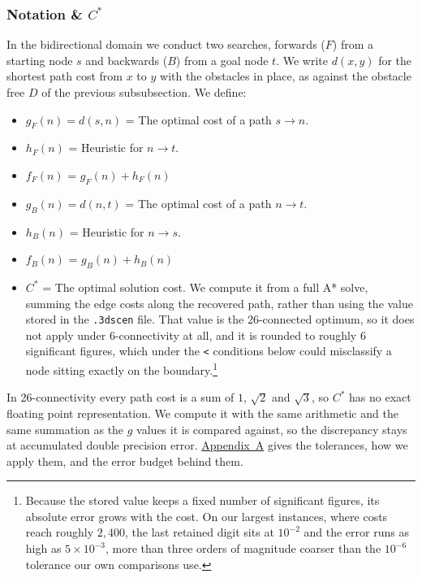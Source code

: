 \documentclass[letterpaper]{article} %
\begin{document}
\subsubsection{Notation \& $C^*$}
In the bidirectional domain we conduct two searches, forwards ($F$) from a starting node $s$ and backwards ($B$) from a goal node $t$. We write $d(x,y)$ for the shortest path cost from $x$ to $y$ with the obstacles in place, as against the obstacle free $D$ of the previous subsubsection. We define:
\begin{itemize}
  \item $g_F(n) = d(s,n)$ = The optimal cost of a path $s \to n$.
  \item $h_F(n)$ = Heuristic for $n \to t$.
  \item $f_F(n)$ = $g_F(n)+h_F(n)$
  \item $g_B(n) = d(n,t)$ = The optimal cost of a path $n \to t$.
  \item $h_B(n)$ = Heuristic for $n \to s$.
  \item $f_B(n)$ = $g_B(n)+h_B(n)$
  \item $C^*$ = The optimal solution cost. We compute it from a full A* solve, summing the edge costs along the recovered path, rather than using the value stored in the \texttt{.3dscen} file. That value is the 26-connected optimum, so it does not apply under 6-connectivity at all, and it is rounded to roughly 6 significant figures, which under the \texttt{<} conditions below could misclassify a node sitting exactly on the boundary.\footnote{Because the stored value keeps a fixed number of significant figures, its absolute error grows with the cost. On our largest instances, where costs reach roughly $2{,}400$, the last retained digit sits at $10^{-2}$ and the error runs as high as $5\times10^{-3}$, more than three orders of magnitude coarser than the $10^{-6}$ tolerance our own comparisons use.}
\end{itemize} In 26-connectivity every path cost is a sum of $1$, $\sqrt{2}$ and $\sqrt{3}$, so $C^*$ has no exact floating point representation. We compute it with the same arithmetic and the same summation as the $g$ values it is compared against, so the discrepancy stays at accumulated double precision error. \hyperref[app:a]{Appendix~A} gives the tolerances, how we apply them, and the error budget behind them.
\end{document}
